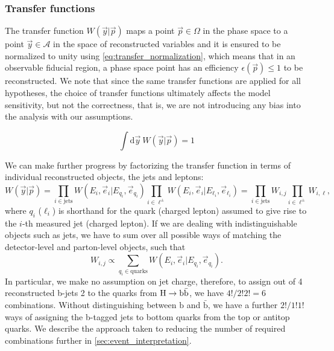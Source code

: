 \subsubsection{Transfer functions}
\label{sec:transfer_functions}

The transfer function $W(\vec{y} | \vec{p})$ maps a point $\vec{p} \in \Omega$ in the phase space to a point $\vec{y} \in \mathcal{A}$ in the space of reconstructed variables and it is ensured to be normalized to unity using \cref{eq:transfer_normalization}, which means that in an observable fiducial region, a phase space point has an efficiency $\epsilon(\vec{p}) \leq 1$ to be reconstructed. We note that since the same transfer functions are applied for all hypotheses, the choice of transfer functions ultimately affects the model sensitivity, but not the correctness, that is, we are not introducing any bias into the analysis with our assumptions.

\begin{equation}
\label{eq:transfer_normalization}
\int \mathrm{d}\vec{y}~W(\vec{y} | \vec{p}) = 1
\end{equation}

We can make further progress by factorizing the transfer function in terms of individual reconstructed objects, the jets and leptons:
\begin{equation}
W(\vec{y} | \vec{p}) = \prod_{i\in \mathrm{jets}} W(E_i, \vec{e}_i | E_{q_i}, \vec{e}_{q_i})
\prod_{i\in \ell^\pm} W(E_i, \vec{e}_i | E_{\ell_i}, \vec{e}_{\ell_i}) = \prod_{i \in \mathrm{jets}} W_{i,j} \prod_{i \in \ell^\pm} W_{i,\ell},
\end{equation}
where $q_i$ ($\ell_i$) is shorthand for the quark (charged lepton) assumed to give rise to the $i$-th measured jet (charged lepton). If we are dealing with indistinguishable objects such as jets, we have to sum over all possible ways of matching the detector-level and parton-level objects, such that
\begin{equation}
\label{eq:tf_combination_sum}
W_{i,j} \propto \sum_{q_i \in \mathrm{quarks}} W(E_i, \vec{e}_i | E_{q_i}, \vec{e}_{q_i}).
\end{equation}
In particular, we make no assumption on jet charge, therefore, to assign out of 4 reconstructed b-jets 2 to the quarks from $\mathrm{H} \rightarrow \mathrm{b}\bar{\mathrm{b}}$, we have $4!/2!2! = 6$ combinations. Without distinguishing between $\mathrm{b}$ and $\bar{\mathrm{b}}$, we have a further $2!/1!1!$ ways of assigning the b-tagged jets to bottom quarks from the top or antitop quarks. We describe the approach taken to reducing the number of required combinations further in \cref{sec:event_interpretation}.

